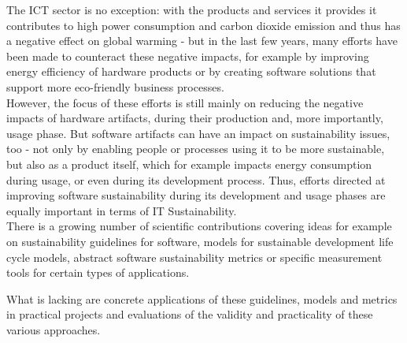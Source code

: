 The ICT sector is no exception: with the products and services it provides it contributes to high power consumption and carbon dioxide emission %
 and thus has a negative effect on global warming \cite{smart2020} %
- but in the last few years, many efforts have been made to counteract these negative impacts, for example by improving energy efficiency of hardware products or by creating software solutions that support more eco-friendly business processes.\\
However, the focus of these efforts is still mainly on reducing the negative impacts of hardware artifacts, %
 during their production and, more importantly, usage phase. But software artifacts can have an impact on sustainability issues, too - not only by enabling people or processes using it to be more sustainable, but also as a product itself, which for example impacts energy consumption during usage, or even during its development process. %
Thus, efforts directed at improving software sustainability during its development and usage phases are equally important in terms of IT Sustainability.\\
There is a growing number of scientific contributions covering ideas for example on sustainability guidelines for software, models for sustainable development life cycle models, abstract software sustainability metrics or specific measurement tools for certain types of applications. %

What is lacking %
are %
concrete applications of these guidelines, models and metrics in practical projects %
and evaluations of the validity and practicality of these various approaches.


